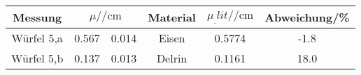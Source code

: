 \label{tab:tabWürfel5ab}
	\begin{tabular}{cS[table-format=1.3]@{${}\pm{}$}S[table-format=1.3]cS[table-format=1.4]S[table-format=2.1]}
		\toprule
		{Messung} &  & {Material} & {$\mu_.{lit}/\si{\per\centi\metre}$} & {Abweichung/\si{\%}}\\
		\midrule
		 {Würfel 5,a}   & 0.567 & 0.014 & {Eisen} 	& 0.5774	& -1.8  \\
		 {Würfel 5,b} 	& 0.137 & 0.013 & {Delrin} 	& 0.1161  	& 18.0  \\
		\bottomrule
	\end{tabular}
